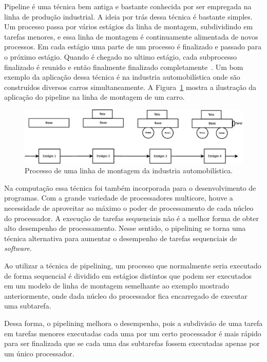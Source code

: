 Pipeline é uma técnica bem antiga e bastante conhecida por ser empregada na
linha de produção industrial. A ideia por trás dessa técnica é bastante simples.
Um processo passa por vários estágios da linha de montagem, subdividindo em
tarefas menores, e essa linha de montagem é continuamente alimentada de novos
processos. Em cada estágio uma parte de um processo é finalizado e passado para
o próximo estágio. Quando é chegado no ultimo estágio, cada subprocesso
finalizado é reunido e então finalmente finalizado
completamente~\cite{Bhujade95}. Um bom exemplo da aplicação dessa técnica é na
industria automobilística onde são construídos diversos carros simultaneamente.
A Figura~\ref{fig:carro} mostra a ilustração da aplicação do pipeline na linha
de montagem de um carro.

\begin{figure}[!h]
	\centering
	\includegraphics[width=0.95\linewidth]{figs/carro}
	\caption{Processo de uma linha de montagem da industria automobilística.}
	\label{fig:carro}
\end{figure}

Na computação essa técnica foi também incorporada para o desenvolvimento de
programas. Com a grande variedade de processadores multicore, houve a
necessidade de aproveitar ao máximo o poder de processamento de cada núcleo do
processador. A execução de tarefas sequenciais não é a melhor forma de obter
alto desempenho de processamento. Nesse sentido, o pipelining se torna uma
técnica alternativa para aumentar o desempenho de tarefas sequenciais de
\textit{software}.

Ao utilizar a técnica de pipelining, um processo que normalmente seria
executado de forma sequencial é dividido em estágios distintos que podem ser
executados em um modelo de linha de montagem semelhante ao exemplo mostrado
anteriormente, onde dada núcleo do processador fica encarregado de executar uma
subtarefa. 

Dessa forma, o pipelining melhora o desempenho, pois a subdivisão de uma tarefa
em tarefas menores executadas cada uma por um certo processador é mais rápido
para ser finalizada que se cada uma das subtarefas fossem executadas apenas por
um único processador.

